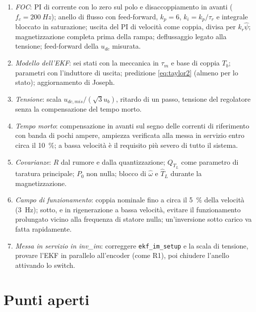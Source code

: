 \documentclass[10pt,a4paper]{scrartcl}
\newcommand{\code}[1]{\texttt{#1}}
\newcommand{\kr}{k_r}
\newcommand{\taur}{\tau_r}
\newcommand{\taum}{\tau_m}
\begin{document}
\begin{onehalfspace}
\begin{enumerate}
\item \emph{FOC}: PI di corrente con lo zero sul polo e disaccoppiamento in avanti ($f_c = \SI{200}{Hz}$); anello di flusso con feed-forward, $k_p = 6$, $k_i = k_p/\taur$ e integrale bloccato in saturazione; uscita del PI di velocità come coppia, divisa per $\kr\hat\psi$; magnetizzazione completa prima della rampa; deflussaggio legato alla tensione; feed-forward della $u_{dc}$ misurata.
\item \emph{Modello dell'EKF}: sei stati con la meccanica in $\taum$ e base di coppia $T_b$; parametri con l'induttore di uscita; predizione \eqref{eq:taylor2} (almeno per lo stato); aggiornamento di Joseph.
\item \emph{Tensione}: scala $u_{dc,mis}/(\sqrt3 u_b)$, ritardo di un passo, tensione del regolatore senza la compensazione del tempo morto.
\item \emph{Tempo morto}: compensazione in avanti sul segno delle correnti di riferimento con banda di pochi ampere, ampiezza verificata alla messa in servizio entro circa il \SI{10}{\percent}; a bassa velocità è il requisito più severo di tutto il sistema.
\item \emph{Covarianze}: $R$ dal rumore e dalla quantizzazione; $Q_{T_L}$ come parametro di taratura principale; $P_0$ non nulla; blocco di $\hat\omega$ e $\hat T_L$ durante la magnetizzazione.
\item \emph{Campo di funzionamento}: coppia nominale fino a circa il \SI{5}{\percent} della velocità (\SI{3}{Hz}); sotto, e in rigenerazione a bassa velocità, evitare il funzionamento prolungato vicino alla frequenza di statore nulla; un'inversione sotto carico va fatta rapidamente.
\item \emph{Messa in servizio in inv\_im}: correggere \code{ekf\_im\_setup} e la scala di tensione, provare l'EKF in parallelo all'encoder (come R1), poi chiudere l'anello attivando lo switch.
\end{enumerate}

\section{Punti aperti}
\label{sec:aperti}


\end{onehalfspace}
\end{document}
